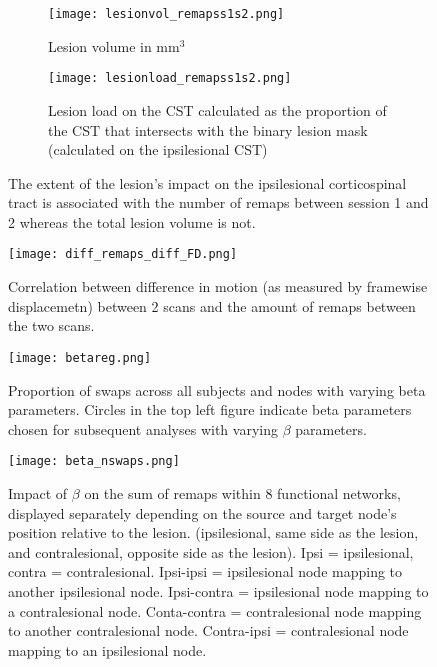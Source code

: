 \documentclass[10pt]{article}
\begin{document}
\begin{figure}[h]%
		\begin{subfigure}[t]{.5\textwidth}
			\texttt{[image: lesionvol\_remapss1s2.png]}
			\caption{Lesion volume in mm$^{3}$}
			\centering
			\label{vollesion}
		\end{subfigure}
		\begin{subfigure}[t]{.5\textwidth}
			\texttt{[image: lesionload\_remapss1s2.png]}
			\caption{Lesion load on the CST calculated as the proportion of the CST that intersects with the binary lesion mask (calculated on the ipsilesional CST)}
			\centering
			\label{cstlesion}
		\end{subfigure}
	\caption{The extent of the lesion's impact on the ipsilesional corticospinal tract is associated with the number of remaps between session 1 and 2 whereas the total lesion volume is not.}
\end{figure}

\begin{figure}[h] %
		\texttt{[image: diff\_remaps\_diff\_FD.png]}
		\caption{Correlation between difference in motion (as measured by framewise displacemetn) between 2 scans and the amount of remaps between the two scans.}	\centering
		\label{FD}
\end{figure}

\begin{figure}[h] %
	\texttt{[image: betareg.png]}
	\caption{Proportion of swaps across all subjects and nodes with varying beta parameters. Circles in the top left figure indicate beta parameters chosen for subsequent analyses with varying $\beta$ parameters.}	\centering
	\label{betareg}
\end{figure}

\begin{figure}[h] %
	\texttt{[image: beta\_nswaps.png]}
	\caption{Impact of $\beta$ on the sum of remaps within 8 functional networks, displayed separately depending on the source and target node's position relative to the lesion. (ipsilesional, same side as the lesion, and contralesional, opposite side as the lesion).  Ipsi = ipsilesional, contra = contralesional. Ipsi-ipsi = ipsilesional node mapping to another ipsilesional node. Ipsi-contra = ipsilesional node mapping to a contralesional node. Conta-contra = contralesional node mapping to another contralesional node. Contra-ipsi = contralesional node mapping to an ipsilesional node. }	\centering
	\label{beta_nswaps}
\end{figure}
\end{document}
